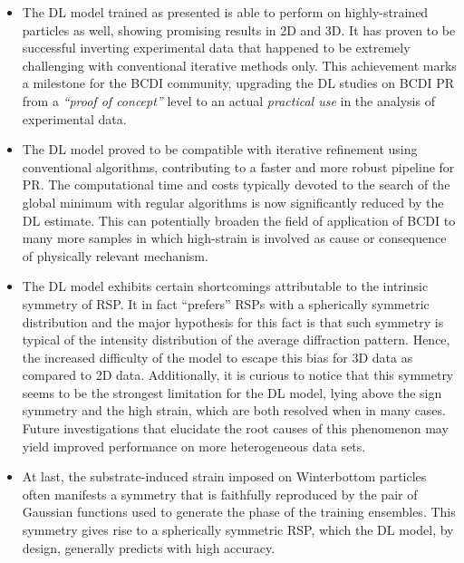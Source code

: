 \begin{itemize}
    \item The DL model trained as presented is able to perform on highly-strained particles as well, showing promising
    results in 2D and 3D. It has proven to be successful inverting experimental data that happened to be extremely challenging with 
    conventional iterative methods only. This achievement marks a milestone for the BCDI community, upgrading the DL studies
    on BCDI PR from a \textit{``proof of concept''} level to an actual \textit{practical use} in the analysis of experimental data. 

    \item The DL model proved to be compatible with iterative refinement using conventional algorithms, contributing to 
    a faster and more robust pipeline for PR. The computational time and costs typically devoted to the search of the 
    global minimum with regular algorithms is now significantly reduced by the DL estimate. This can potentially broaden 
    the field of application of BCDI to many more samples in which high-strain is involved as cause or consequence of physically 
    relevant mechanism.

    \item The DL model exhibits certain shortcomings attributable to the intrinsic symmetry of RSP. It in fact ``prefers''
    RSPs with a spherically symmetric distribution and the major hypothesis for this fact is that such symmetry is typical 
    of the intensity distribution of the average diffraction pattern. Hence, the increased difficulty of the model to escape this
    bias for 3D data as compared to 2D data. Additionally, it is curious to notice that this symmetry seems to be the strongest 
    limitation for the DL model, lying above the sign symmetry and the high strain, which are both resolved when in many cases. 
    Future investigations that elucidate the root causes of this phenomenon may yield improved performance on more heterogeneous 
    data sets. 
    
    \item At last, the substrate-induced strain imposed on Winterbottom particles often manifests a symmetry that is faithfully 
    reproduced by the pair of Gaussian functions used to generate the phase of the training ensembles. This symmetry gives rise to 
    a spherically symmetric RSP, which the DL model, by design, generally predicts with high accuracy. 

  \end{itemize}
